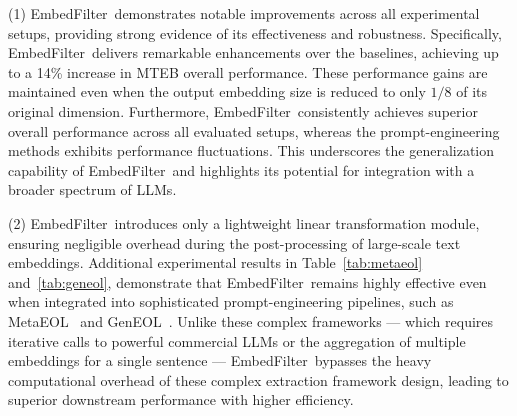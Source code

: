 \documentclass[sigconf]{acmart}
\newcommand{\name}{EmbedFilter}
\begin{document}
\begin{table}[t]
    \centering
    \small
    \caption{Performance of \name\ on STS tasks under the GenEOL framework.}
    \vskip -0.05in
    \label{tab:geneol}
\end{table}


(1) \name\ demonstrates notable improvements across all experimental setups, providing strong evidence of its effectiveness and robustness. 
Specifically, \name\ delivers remarkable enhancements over the baselines, achieving up to a 14\% increase in MTEB overall performance.
These performance gains are maintained even when the output embedding size is reduced to only $1/8$ of its original dimension. 
Furthermore, \name\ consistently achieves superior overall performance across all evaluated setups, whereas the prompt-engineering methods exhibits performance fluctuations.
This underscores the generalization capability of \name\ and highlights its potential for integration with a broader spectrum of LLMs.

(2) \name\ introduces only a lightweight linear transformation module, ensuring negligible overhead during the post-processing of large-scale text embeddings.
Additional experimental results in Table~\ref{tab:metaeol} and~\ref{tab:geneol}, demonstrate that \name\ remains highly effective even when integrated into sophisticated prompt-engineering pipelines, such as MetaEOL~\cite{metaeol} and GenEOL~\cite{geneol}.
Unlike these complex frameworks --- which requires iterative calls to powerful commercial LLMs or the aggregation of multiple embeddings for a single sentence ---
\name\ bypasses the heavy computational overhead of these complex extraction framework design, leading to superior downstream performance with higher efficiency.
\end{document}
